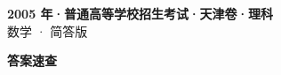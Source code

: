 \documentclass[zihao=-4, a4paper]{ctexart}
\begin{document}
\begin{center}
  {\Large\bfseries 2005 年·普通高等学校招生考试·天津卷·理科}\\[4pt]
  {\large 数学 · 简答版}
\end{center}
\medskip
{}

\clearpage
{}
\begin{center}{\Large\bfseries 答案速查}\end{center}
\medskip

\end{document}

